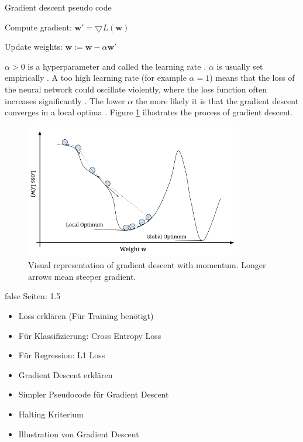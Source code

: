 \documentclass[draft,final,oneside]{vutinfth} %
\begin{document}
\begin{algorithm}
\caption{Gradient descent pseudo code \cite{anintroductiontoneuralnetworks}}\label{gradientedescentalgo}
 {
Compute gradient: $\boldsymbol{w}' = \bigtriangledown	L(\boldsymbol{w})$

Update weights: $\boldsymbol{w} := \boldsymbol{w} - \alpha \boldsymbol{w}'$
}

\end{algorithm}

$\alpha > 0$ is a hyperparameter and called the learning rate \cite{Goodfellow-et-al-2016}. $\alpha$ is usually set empirically \cite{Goodfellow-et-al-2016}. A too high learning rate (for example $\alpha = 1$) means that the loss of the neural network could oscillate  violently, where the loss function often increases significantly \cite{Goodfellow-et-al-2016}. The lower $\alpha$ the more likely it is that the gradient descent converges in a local optima \cite{Goodfellow-et-al-2016}. Figure \ref{fig:gradientdescent} illustrates the process of gradient descent. %

\begin{figure}[ht]
	\centering
  	\includegraphics[width=0.85\textwidth]{graphics/gradientdescent.png}
	\caption{Visual representation of gradient descent with momentum. Longer arrows mean steeper gradient. \cite{Goodfellow-et-al-2016}}
	\label{fig:gradientdescent}
\end{figure}

\if false
Seiten: 1.5
\begin{itemize}
\item Loss erklären (Für Training benötigt)
\item Für Klassifizierung: Cross Entropy Loss
\item Für Regression: L1 Loss
\item Gradient Descent erklären
\item Simpler Pseudocode für Gradient Descent
\item Halting Kriterium
\item Illustration von Gradient Descent

\end{itemize}
\fi
\end{document}
